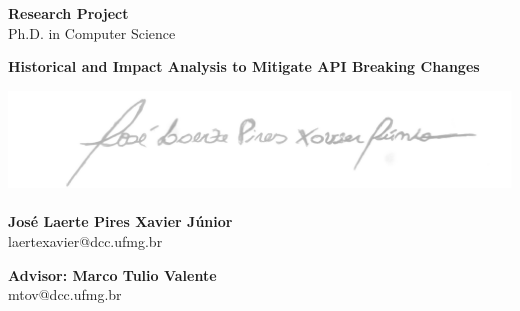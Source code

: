 {\centering

{\LARGE \textbf{Research Project}} \\
{\large Ph.D. in Computer Science }

\vspace{170px}

{\huge \textbf{Historical and Impact Analysis to Mitigate API Breaking Changes}} \\

\vspace{170px}


\includegraphics[scale=0.2]{sig3.png}\\
\vspace{-12mm}
\underline{\hspace{8cm}}\\
\textbf{José Laerte Pires Xavier Júnior} \\
\textrm{laertexavier@dcc.ufmg.br}

\vspace{70px}

\textbf{Advisor: Marco Tulio Valente}\\
\textrm{mtov@dcc.ufmg.br}

\vspace{25px}

}

\newpage

